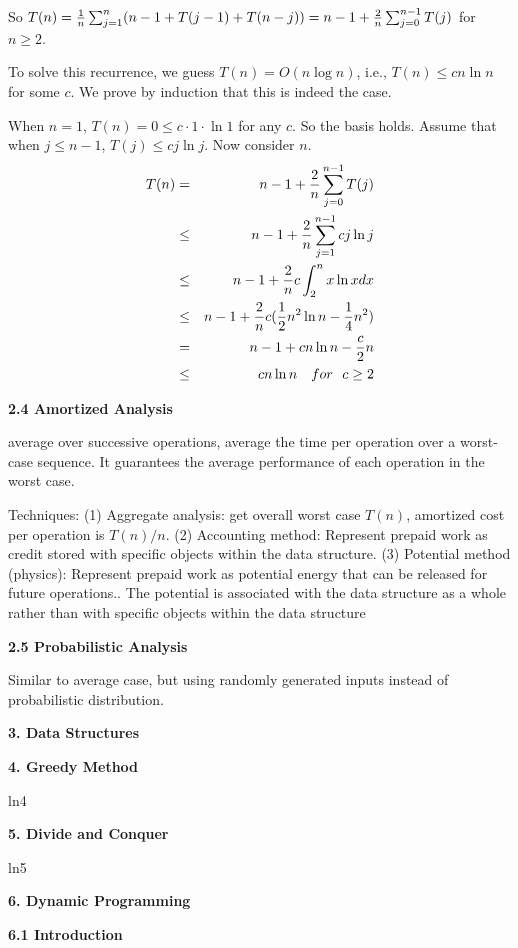 \documentclass[8pt]{minimal}
\begin{document}
\begin{flushleft}
\begin{multicols}{3}
So $T(n)={1\over n}\sum_{j=1}^n(n-1+T(j-1)+T(n-j))=n-1+{2\over n}
\sum_{j=0}^{n-1}T(j)$ for $n\ge2$.

To solve this recurrence, we guess $T(n)=O(n\log n)$, i.e., 
$T(n)\le cn\ln n$ for some $c$. We prove by induction that
this is indeed the case.

When $n=1$, $T(n)=0\le c\cdot 1\cdot \ln 1$ for any $c$. So the
basis holds. Assume that when $j\le n-1$, $T(j)\le cj\ln j$.
Now consider $n$.
\begin{eqnarray*}
T(n)&=&n-1+{2\over n}\sum_{j=0}^{n-1}T(j)\\
&\le&n-1+{2\over n}\sum_{j=1}^{n-1}cj\ln j\\
&\le&n-1+{2\over n}c\int_2^n x\ln xdx\\
&\le&n-1+{2\over n}c({1\over2}n^2\ln n-{1\over4}n^2)\\
&=&n-1+cn\ln n-{c\over2}n\\
&\le&cn\ln n { \quad for\ \ } c\ge  2
\end{eqnarray*}


    \textbf{2.4 Amortized Analysis}

average over successive operations,
average the time per operation over a worst-case sequence.
It guarantees the average performance of each operation in the worst case.

Techniques:
(1) Aggregate analysis: get overall worst case $T(n)$, amortized cost per operation is $T(n) / n$.
(2) Accounting method: Represent prepaid work as credit stored with speciﬁc objects within the data
structure.
(3) Potential method (physics): Represent prepaid work as potential energy that can be released for future operations..
The potential is associated with the data structure as a whole rather than with speciﬁc objects within the data
structure

    \textbf{2.5 Probabilistic Analysis}

Similar to average case, but using randomly generated inputs instead of probabilistic distribution.


    \textbf{3. Data Structures}

    


    \textbf{4. Greedy Method}

    ln4


    \textbf{5. Divide and Conquer}

    ln5


    \textbf{6. Dynamic Programming}

    \textbf{6.1 Introduction}


\end{multicols}
\end{flushleft}
\end{document}
